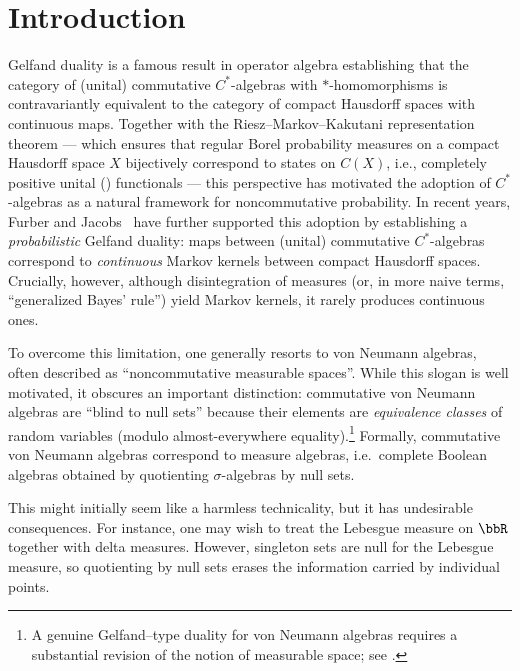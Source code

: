 
\section{Introduction}
Gelfand duality \cite[\S IV.4]{johnstone82stone} is a famous result in operator algebra establishing that the category of (unital) commutative $C^*$-algebras with $*$-homomorphisms is contravariantly equivalent to the category of compact Hausdorff spaces with continuous maps.
Together with the Riesz--Markov--Kakutani representation theorem
\cite[Theorem 2.14]{rudin1987analysis} --- which ensures that regular Borel probability measures on a compact Hausdorff space $X$ bijectively correspond to states on $C(X)$, i.e., completely positive unital (\cpu) functionals --- this perspective has motivated the adoption of $C^*$-algebras as a natural framework for noncommutative probability.
In recent years, Furber and Jacobs~\cite{furber_jacobs_gelfand} have further supported this adoption by establishing a \emph{probabilistic} Gelfand duality: \cpu maps between (unital) commutative $C^*$-algebras correspond to \emph{continuous} Markov kernels between compact Hausdorff spaces. 
Crucially, however, although disintegration of measures (or, in more naive terms, ``generalized Bayes' rule'') yield Markov kernels, it rarely produces continuous ones.

To overcome this limitation, one generally resorts to von Neumann algebras, often described as ``noncommutative measurable spaces''.
While this slogan is well motivated, it obscures an important distinction:
commutative von Neumann algebras are ``blind to null sets'' because their elements are \emph{equivalence classes} of random variables (modulo almost-everywhere equality).\footnote{A genuine Gelfand--type duality for von Neumann algebras requires a substantial revision of the notion of measurable space; see \cite{pavlov2022duality}.}
Formally, commutative von Neumann algebras correspond to measure algebras, i.e.\ complete Boolean algebras obtained by quotienting $\sigma$-algebras by null sets.

This might initially seem like a harmless technicality, but it has undesirable consequences.
For instance, one may wish to treat the Lebesgue measure on $\bbR$ together with delta measures.
However, singleton sets are null for the Lebesgue measure, so quotienting by null sets erases the information carried by individual points.

